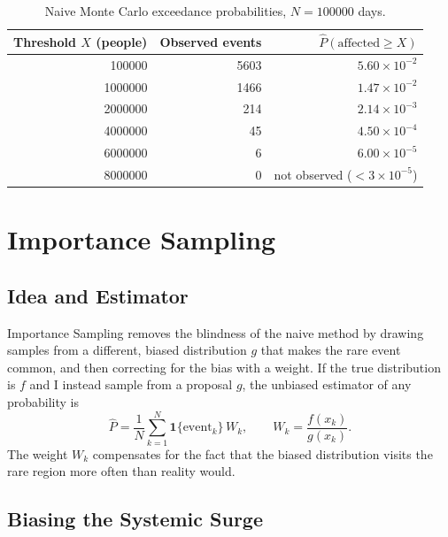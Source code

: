 \documentclass[11pt,a4paper]{article}
\begin{document}
\begin{table}[H]
    \centering
    \caption{Naive Monte Carlo exceedance probabilities, $N = \num{100000}$ days.}
    \label{tab:naive}
    \begin{tabular}{rrr}
        \toprule
        Threshold $X$ (people) & Observed events & $\hat{P}(\text{affected} \ge X)$ \\
        \midrule
        \num{100000}  & 5603 & $5.60\times 10^{-2}$ \\
        \num{1000000} & 1466 & $1.47\times 10^{-2}$ \\
        \num{2000000} & 214  & $2.14\times 10^{-3}$ \\
        \num{4000000} & 45   & $4.50\times 10^{-4}$ \\
        \num{6000000} & 6    & $6.00\times 10^{-5}$ \\
        \num{8000000} & 0    & not observed ($< 3\times 10^{-5}$) \\
        \bottomrule
    \end{tabular}
\end{table}

\section{Importance Sampling}

\subsection{Idea and Estimator}

Importance Sampling removes the blindness of the naive method by drawing samples
from a different, biased distribution $g$ that makes the rare event common, and
then correcting for the bias with a weight. If the true distribution is $f$ and
I instead sample from a proposal $g$, the unbiased estimator of any
probability is
\begin{equation}
    \hat{P} = \frac{1}{N}\sum_{k=1}^{N} \mathbf{1}\{\text{event}_k\}\, W_k,
    \qquad W_k = \frac{f(x_k)}{g(x_k)} .
\end{equation}
The weight $W_k$ compensates for the fact that the biased distribution visits the
rare region more often than reality would.

\subsection{Biasing the Systemic Surge}
\end{document}

